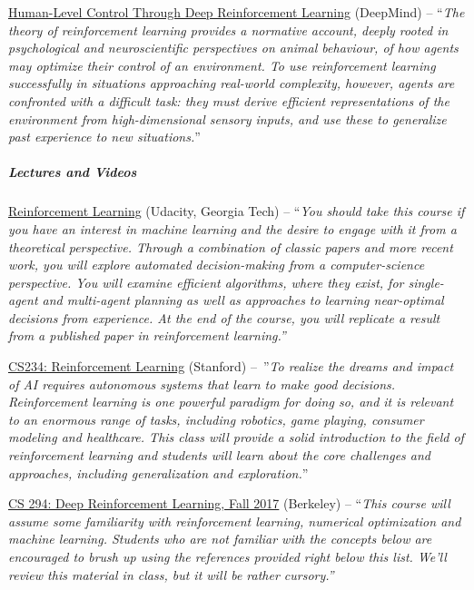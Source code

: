 \documentclass[a4paper, 11pt]{article}
\begin{document}
\href{https://web.stanford.edu/class/psych209/Readings/MnihEtAlHassibis15NatureControlDeepRL.pdf}{Human-Level
Control Through Deep Reinforcement Learning} (DeepMind) -- ``\emph{The
theory of reinforcement learning provides a normative account, deeply
rooted in psychological and neuroscientific perspectives on animal
behaviour, of how agents may optimize their control of an environment.
To use reinforcement learning successfully in situations approaching
real-world complexity, however, agents are confronted with a difficult
task: they must derive efficient representations of the environment from
high-dimensional sensory inputs, and use these to generalize past
experience to new situations.}''

\subparagraph{\textbf{Lectures and Videos}}

\href{https://www.udacity.com/course/reinforcement-learning-{}-ud600}{Reinforcement
Learning} (Udacity, Georgia Tech) -- ``\emph{You should take this course
if you have an interest in machine learning and the desire to engage
with it from a theoretical perspective. Through a combination of classic
papers and more recent work, you will explore automated decision-making
from a computer-science perspective. You will examine efficient
algorithms, where they exist, for single-agent and multi-agent planning
as well as approaches to learning near-optimal decisions from
experience. At the end of the course, you will replicate a result from a
published paper in reinforcement learning.''}

\href{http://web.stanford.edu/class/cs234/index.html}{CS234:
Reinforcement Learning} (Stanford) --~''\emph{To realize the dreams and
impact of AI requires autonomous systems that learn to make good
decisions. Reinforcement learning is one powerful paradigm for doing so,
and it is relevant to an enormous range of tasks, including robotics,
game playing, consumer modeling and healthcare. This class will provide
a solid introduction to the field of reinforcement learning and students
will learn about the core challenges and approaches, including
generalization and exploration.}''

\href{http://rll.berkeley.edu/deeprlcourse/}{CS 294: Deep Reinforcement
Learning, Fall 2017} (Berkeley) -- ``\emph{This course will assume some
familiarity with reinforcement learning, numerical optimization and
machine learning. Students who are not familiar with the concepts below
are encouraged to brush up using the references provided right below
this list. We'll review this material in class, but it will be rather
cursory.''}
\end{document}
